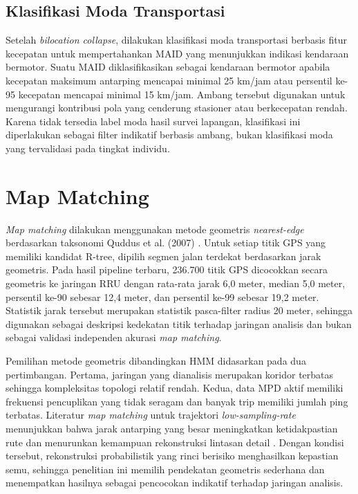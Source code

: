 \subsection{Klasifikasi Moda Transportasi}

Setelah \textit{bilocation collapse}, dilakukan klasifikasi moda transportasi berbasis fitur kecepatan untuk mempertahankan MAID yang menunjukkan indikasi kendaraan bermotor. Suatu MAID diklasifikasikan sebagai kendaraan bermotor apabila kecepatan maksimum antarping mencapai minimal 25 km/jam atau persentil ke-95 kecepatan mencapai minimal 15 km/jam. Ambang tersebut digunakan untuk mengurangi kontribusi pola yang cenderung stasioner atau berkecepatan rendah. Karena tidak tersedia label moda hasil survei lapangan, klasifikasi ini diperlakukan sebagai filter indikatif berbasis ambang, bukan klasifikasi moda yang tervalidasi pada tingkat individu.

\section{Map Matching}

\textit{Map matching} dilakukan menggunakan metode geometris \textit{nearest-edge} berdasarkan taksonomi Quddus et al. (2007) \cite{quddus2007}. Untuk setiap titik GPS yang memiliki kandidat R-tree, dipilih segmen jalan terdekat berdasarkan jarak geometris. Pada hasil pipeline terbaru, 236.700 titik GPS dicocokkan secara geometris ke jaringan RRU dengan rata-rata jarak 6,0 meter, median 5,0 meter, persentil ke-90 sebesar 12,4 meter, dan persentil ke-99 sebesar 19,2 meter. Statistik jarak tersebut merupakan statistik pasca-filter radius 20 meter, sehingga digunakan sebagai deskripsi kedekatan titik terhadap jaringan analisis dan bukan sebagai validasi independen akurasi \textit{map matching}.

Pemilihan metode geometris dibandingkan HMM didasarkan pada dua pertimbangan. Pertama, jaringan yang dianalisis merupakan koridor terbatas sehingga kompleksitas topologi relatif rendah. Kedua, data MPD aktif memiliki frekuensi pencuplikan yang tidak seragam dan banyak trip memiliki jumlah ping terbatas. Literatur \textit{map matching} untuk trajektori \textit{low-sampling-rate} menunjukkan bahwa jarak antarping yang besar meningkatkan ketidakpastian rute dan menurunkan kemampuan rekonstruksi lintasan detail \cite{lou2009,zheng2012,bian2020}. Dengan kondisi tersebut, rekonstruksi probabilistik yang rinci berisiko menghasilkan kepastian semu, sehingga penelitian ini memilih pendekatan geometris sederhana dan menempatkan hasilnya sebagai pencocokan indikatif terhadap jaringan analisis.

